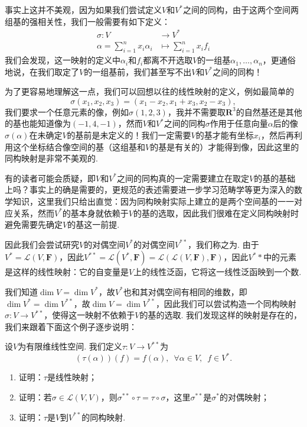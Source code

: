 事实上这并不美观，因为如果我们尝试定义$V$和$V^*$之间的同构，由于这两个空间两组基的强相关性，我们一般需要有如下定义：
\begin{align*}
    \sigma:V                       & \to V^*                   \\
    \alpha=\sum_{i=1}^nx_i\alpha_i & \mapsto\sum_{i=1}^nx_if_i
\end{align*}
我们会发现，这一映射的定义中$\alpha_i$和$f_i$都离不开选取$V$的一组基$\alpha_1,\ldots,\alpha_n$，更通俗地说，在我们取定了$V$的一组基前，我们甚至写不出$V$和$V^*$之间的同构！

为了更容易地理解这一点，我们可以回想以往的线性映射的定义，例如最简单的
\[\sigma(x_1,x_2,x_3)=(x_1-x_2,x_1+x_3,x_2-x_3),\]
我们要求一个任意元素的像，例如$\sigma(1,2,3)$，我并不需要取$\mathbf{R}^3$的自然基还是其他的基也能知道像为$(-1,4,-1)$，然而$V$和$V^*$之间的同构$\sigma$作用于任意向量$\alpha$后的像$\sigma(\alpha)$在未确定$V$的基前是未定义的！我们一定需要$V$的基才能有坐标$x_i$，然后再利用这个坐标结合像空间的基（这组基和$V$的基是有关的）才能得到像，因此这里的同构映射是非常不美观的.

有的读者可能会质疑，即$V$和$V^*$之间的同构真的一定需要建立在取定$V$的基的基础上吗？事实上的确是需要的，更规范的表述需要进一步学习范畴学等更为深入的数学知识，这里我们只给出直觉：因为同构映射实际上建立的是两个空间基的一一对应关系，然而$V^*$的基本身就依赖于$V$的基的选取，因此我们很难在定义同构映射时避免需要先确定$V$的基这一前提.

因此我们会尝试研究$V$的对偶空间$V^*$的对偶空间$V^{**}$，我们称之为. 由于$V^*=\mathcal{L}(V,\mathbf{F})$，因此$V^{**}=\mathcal{L}(V^*,\mathbf{F})=\mathcal{L}(\mathcal{L}(V,\mathbf{F}),\mathbf{F})$，因此$V^**$中的元素是这样的线性映射：它的自变量是$V$上的线性泛函，它将这一线性泛函映到一个数.

我们知道$\dim V=\dim V^*$，故$V^*$也和其对偶空间有相同的维数，即$\dim V^*=\dim V^{**}$，故$\dim V=\dim V^{**}$，因此我们可以尝试构造一个同构映射$\sigma:V\to V^{**}$，使得这一映射不依赖于$V$的基的选取. 我们发现这样的映射是存在的，我们来跟着下面这个例子逐步说明：
\begin{example}
    设$V$为有限维线性空间. 我们定义$\tau:V\to V^{**}$为
    \[(\tau(\alpha))(f)=f(\alpha),\enspace\forall \alpha\in V,\enspace f\in V^*.\]
    \begin{enumerate}
        \item 证明：$\tau$是线性映射；

        \item 证明：若$\sigma\in\mathcal{L}(V,V)$，则$\sigma^{**}\circ\tau=\tau\circ\sigma$，这里$\sigma^{**}$是$\sigma^*$的对偶映射；

        \item 证明：$\tau$是$V$到$V^{**}$的同构映射.
    \end{enumerate}
\end{example}

